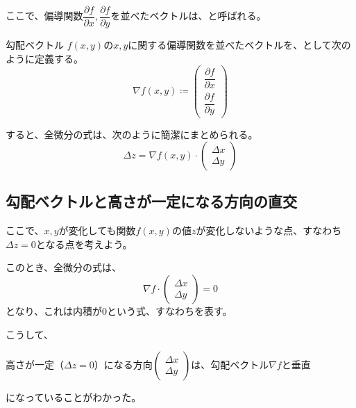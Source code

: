 \documentclass[../../../topic_calculus]{subfiles}
\begin{document}
ここで、偏導関数$\dfrac{\partial f}{\partial x},\dfrac{\partial f}{\partial y}$を並べたベクトルは、と呼ばれる。

\begin{definition}{勾配ベクトル}\label{def:gradient}
  $f(x,y)$の$x,y$に関する偏導関数を並べたベクトルを、として次のように定義する。
  \begin{equation}
    \nabla f(x,y) \coloneqq \begin{pmatrix} \dfrac{\partial f}{\partial x} \\ \dfrac{\partial f}{\partial y} \end{pmatrix}
  \end{equation}
\end{definition}

すると、全微分の式は、次のように簡潔にまとめられる。
\begin{equation*}
  \Delta z = \nabla f(x,y) \cdot \begin{pmatrix} \Delta x \\ \Delta y \end{pmatrix}
\end{equation*}

\subsection{勾配ベクトルと高さが一定になる方向の直交}

ここで、$x,y$が変化しても関数$f(x,y)$の値$z$が変化しないような点、すなわち$\Delta z = 0$となる点を考えよう。

このとき、全微分の式は、
\begin{equation*}
  \nabla f \cdot \begin{pmatrix} \Delta x \\ \Delta y \end{pmatrix} = 0
\end{equation*}
となり、これは内積が0という式、すなわちを表す。

\br

こうして、
\begin{emphabox}
  \begin{spacebox}
    \begin{center}
      高さが一定（$\Delta z = 0$）になる方向$\begin{pmatrix} \Delta x \\ \Delta y \end{pmatrix}$は、勾配ベクトル$\nabla f$と垂直
    \end{center}
  \end{spacebox}
\end{emphabox}
になっていることがわかった。
\end{document}
